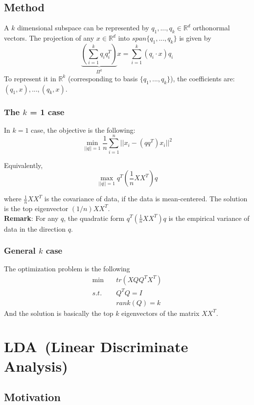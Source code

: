 \subsection{Method}
A $k$ dimensional subspace can be represented by $q_1,...,q_k \in
\mathbb{R}^d$ orthonormal vectors. 
The projection of any $x\in \mathbb{R}^d$ into $span\{q_1,...,q_k\}$
is given by 
\[
\underbrace{(\sum_{i=1}^k q_i q_i^T)}_{\Pi^k}x = \sum_{i=1}^k
(q_i\cdot x)q_i 
\]
To represent it in $\mathbb{R}^k$ (corresponding to basis $\{q_1,...,q_k\}$), the
coefficients are: $(q_1,x),...,(q_k,x)$.

\subsubsection{The $k$ = 1 case}
In $k=1$ case, the objective is the following:\\

$$\underset{||q||=1}{\min} \frac{1}{n} \sum_{i=1}^n
||x_i - (qq^T)x_i||^2$$

\noindent Equivalently,\\

$$\underset{||q||=1}{\max}q^T(\frac{1}{n} XX^T)q$$

\noindent where $\frac{1}{n}XX^T$ is the covariance of data, if the
data is mean-centered. The solution is the top eigenvector
$(1/n)XX^T$.\\ 

\noindent \textbf{Remark}: For any $q$, the quadratic form
$q^T(\frac{1}{n}XX^T)q$ is the empirical variance of data in the
direction $q$. 

\subsubsection{General $k$ case}
The optimization problem is the following
\begin{align*}
\min & \quad tr(XQQ^TX^T)\\
s.t. & \quad Q^TQ = I\\
 &  \quad rank(Q) = k
\end{align*}
And the solution is basically the top $k$ eigenvectors of the matrix $XX^T$. 

\section{LDA~(Linear Discriminate Analysis)}
\subsection{Motivation}
